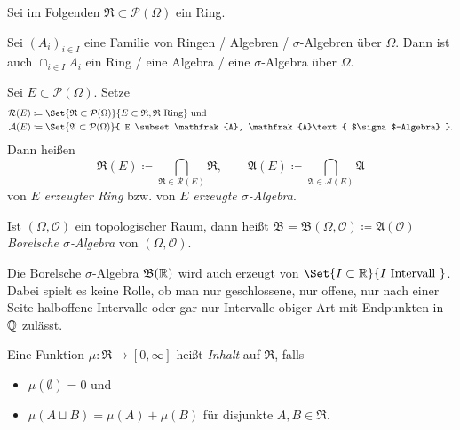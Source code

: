 \documentclass{cheat-sheet}
\newcommand{\PS}{\mathcal{P}} %
\newcommand{\PSO}{\PS(\Omega)} %
\newcommand{\Alg}{\mathfrak{A}}
\newcommand{\Ring}{\mathfrak{R}}
\newcommand{\Bor}{\mathfrak{B}} %
\begin{document}
\begin{nota}
  Sei im Folgenden $\Ring \subset \PSO$ ein Ring.
\end{nota}


\begin{satz}
  Sei $(A_i)_{i \in I}$ eine Familie von Ringen / Algebren / $\sigma$-Algebren über $\Omega$. Dann ist auch $\cap_{i \in I} A_i$ ein Ring / eine Algebra / eine $\sigma$-Algebra über $\Omega$.
\end{satz}

\begin{defn}
  Sei $E \subset \PSO$. Setze
  \begin{align*}
    \mathcal{R}(E) &\coloneqq \Set{ \Ring \subset \PSO }{ E \subset \Ring, \Ring \text{ Ring} } \text{ und} \\
    \mathcal{A}(E) &\coloneqq \Set{ \Alg \subset \PSO }{ E \subset \Alg, \Alg \text{ $\sigma$-Algebra} }.
  \end{align*}
  Dann heißen
  \[
    \Ring(E) \coloneqq\!\bigcap_{\Ring \in \mathcal{R}(E)}\!\Ring, \qquad
    \Alg(E)  \coloneqq\!\bigcap_{\Alg  \in \mathcal{A}(E)}\!\Alg
  \]
  von $E$ \emph{erzeugter Ring} bzw. von $E$ \emph{erzeugte $\sigma$-Algebra}.
\end{defn}

\begin{defn}
  Ist $(\Omega, \mathcal{O})$ ein topologischer Raum, dann heißt $\Bor = \Bor(\Omega, \mathcal{O}) \coloneqq \Alg(\mathcal{O})$ \emph{Borelsche $\sigma$-Algebra} von $(\Omega, \mathcal{O})$.
\end{defn}

\begin{bem}
  Die Borelsche $\sigma$-Algebra $\Bor(\R)$ wird auch erzeugt von $\Set{I \subset \R }{ I \text{ Intervall } }$. Dabei spielt es keine Rolle, ob man nur geschlossene, nur offene, nur nach einer Seite halboffene Intervalle oder gar nur Intervalle obiger Art mit Endpunkten in $\mathbb{Q}$ zulässt.
\end{bem}

\begin{defn}
  Eine Funktion $\mu : \Ring \to [0, \infty]$ heißt \emph{Inhalt} auf $\Ring$, falls
  \begin{itemize}
    \item $\mu(\emptyset) = 0$ und
    \item $\mu(A \sqcup B) = \mu(A) + \mu(B)$ für disjunkte $A, B \in \Ring$.
  \end{itemize}
\end{defn}
\end{document}
